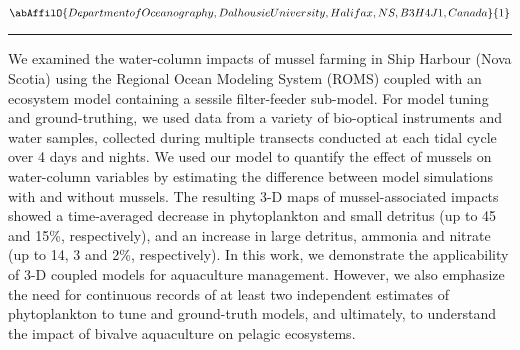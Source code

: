 \begin{minipage}{\linewidth}\begin{center}\begin{minipage}{\linewidth}
   \vspace{2 mm} \begin{center}
    \vspace{2 mm}\begin{center}
  
  $\abAffilO{Department of Oceanography, Dalhousie University, Halifax, NS, B3H 4J1, Canada}{1}$

  \end{center}
  \vspace{2 mm}
  \end{center}\end{minipage}\end{center}
  \begin{center}\rule{0.70\linewidth}{0.5 pt}\end{center}
  \begin{minipage}{\linewidth}
\noindent We examined the water-column impacts of mussel farming in Ship Harbour (Nova Scotia) using the Regional Ocean Modeling System (ROMS) coupled with an ecosystem model containing a sessile filter-feeder sub-model. For model tuning and ground-truthing, we used data from a variety of bio-optical instruments and water samples, collected during multiple transects conducted at each tidal cycle over 4 days and nights. We used our model to quantify the effect of mussels on water-column variables by estimating the difference between model simulations with and without mussels. The resulting 3-D maps of mussel-associated impacts showed a time-averaged decrease in phytoplankton and small detritus (up to 45 and 15\%, respectively), and an increase in large detritus, ammonia and nitrate (up to 14, 3 and 2\%, respectively). In this work, we demonstrate the applicability of 3-D coupled models for aquaculture management. However, we also emphasize the need for continuous records of at least two independent estimates of phytoplankton to tune and ground-truth models, and ultimately, to understand the impact of bivalve aquaculture on pelagic ecosystems.
\end{minipage}\end{minipage}
